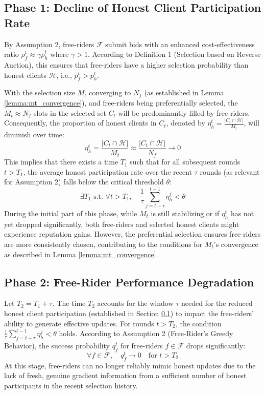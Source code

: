 \documentclass[conference]{IEEEtran}
\newcommand{\HC}{\mathcal{H}}
\newcommand{\FC}{\mathcal{F}}
\begin{document}
\subsection{Phase 1: Decline of Honest Client Participation Rate}
\label{phase:hc_decline}
By Assumption 2, free-riders $\FC$ submit bids with an enhanced cost-effectiveness ratio $\rho_f^t \approx \gamma \bar{\rho}_h^t$ where $\gamma > 1$. According to Definition 1 (Selection based on Reverse Auction), this ensures that free-riders have a higher selection probability than honest clients $\HC$, i.e., $p_f^t > p_h^t$.

With the selection size $M_t$ converging to $N_f$ (as established in Lemma \ref{lemma:mt_convergence}), and free-riders being preferentially selected, the $M_t \approx N_f$ slots in the selected set $C_t$ will be predominantly filled by free-riders. Consequently, the proportion of honest clients in $C_t$, denoted by $\eta_h^t = \frac{|C_t \cap \HC|}{M_t}$, will diminish over time:
\begin{equation}
    \eta_h^t = \frac{|C_t \cap \HC|}{M_t} \approx \frac{|C_t \cap \HC|}{N_f} \to 0
\end{equation}
This implies that there exists a time $T_1$ such that for all subsequent rounds $t > T_1$, the average honest participation rate over the recent $\tau$ rounds (as relevant for Assumption 2) falls below the critical threshold $\theta$:
\begin{equation}
    \exists T_1 \text{ s.t. } \forall t > T_1, \quad \frac{1}{\tau}\sum_{j=t-\tau}^{t-1} \eta_h^j < \theta
\end{equation}
During the initial part of this phase, while $M_t$ is still stabilizing or if $\eta_h^t$ has not yet dropped significantly, both free-riders and selected honest clients might experience reputation gains. However, the preferential selection ensures free-riders are more consistently chosen, contributing to the conditions for $M_t$'s convergence as described in Lemma \ref{lemma:mt_convergence}.

\subsection{Phase 2: Free-Rider Performance Degradation}
\label{phase:fr_degradation}
Let $T_2 = T_1 + \tau$. The time $T_2$ accounts for the window $\tau$ needed for the reduced honest client participation (established in Section \ref{phase:hc_decline}) to impact the free-riders' ability to generate effective updates.
For rounds $t > T_2$, the condition $\frac{1}{\tau}\sum_{j=t-\tau}^{t-1} \eta_h^j < \theta$ holds. According to Assumption 2 (Free-Rider's Greedy Behavior), the success probability $q_f^t$ for free-riders $f \in \FC$ drops significantly:
\begin{equation}
    \forall f \in \FC, \quad q_f^t \to 0 \quad \text{for } t > T_2
\end{equation}
At this stage, free-riders can no longer reliably mimic honest updates due to the lack of fresh, genuine gradient information from a sufficient number of honest participants in the recent selection history.
\end{document}
